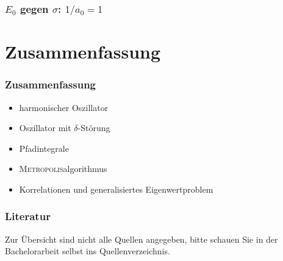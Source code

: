 \documentclass[ngerman, fleqn]{beamer}
\newcommand\gausswidth{\sigma}
\newcommand\timestep{a}
\begin{document}
\begin{frame}
    \frametitle{$E_0$ gegen $\gausswidth$: $1/a_0 = \num{+1}$}

\end{frame}

\section*{Zusammenfassung}

\begin{frame}
    \frametitle{Zusammenfassung}

    \begin{itemize}
        \item
            harmonischer Oszillator
        \item
            Oszillator mit $\delta$-Störung
        \item
            Pfadintegrale
        \item
            \textsc{Metropolis}algorithmus
        \item
            Korrelationen und generalisiertes Eigenwertproblem
    \end{itemize}
\end{frame}

\begin{frame}
    \frametitle{Literatur}

    \printbibliography

    \begin{small}
    Zur Übersicht sind nicht alle Quellen angegeben, bitte schauen Sie in der
    Bachelorarbeit selbst ins Quellenverzeichnis.
    \end{small}
\end{frame}
\end{document}

